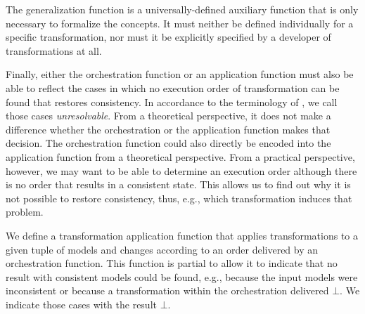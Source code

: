 The generalization function is a universally-defined auxiliary function that is only necessary to formalize the concepts.
It must neither be defined individually for a specific transformation, nor must it be explicitly specified by a developer of transformations at all.

Finally, either the orchestration function or an application function must also be able to reflect the cases in which no execution order of transformation can be found that restores consistency.
In accordance to the terminology of \textcite{stevens2020BidirectionalTransformationLarge-SoSym}, we call those cases \emph{unresolvable}.
From a theoretical perspective, it does not make a difference whether the orchestration or the application function makes that decision. 
The orchestration function could also directly be encoded into the application function from a theoretical perspective.
From a practical perspective, however, we may want to be able to determine an execution order although there is no order that results in a consistent state.
This allows us to find out why it is not possible to restore consistency, thus, e.g., which transformation induces that problem.

We define a transformation application function that applies transformations to a given tuple of models and changes according to an order delivered by an orchestration function.
This function is partial to allow it to indicate that no result with consistent models could be found, e.g., because the input models were inconsistent or because a transformation within the orchestration delivered $\bot$.
We indicate those cases with the result $\bot$.


